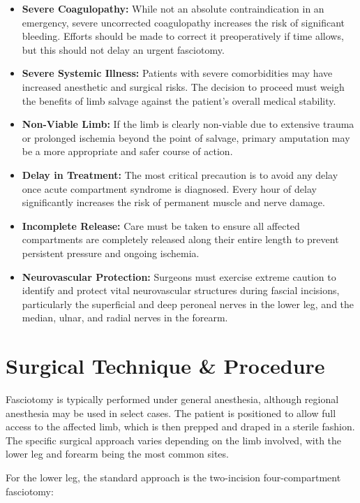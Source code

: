 \begin{itemize}
  \item \textbf{Severe Coagulopathy:} While not an absolute contraindication in an emergency, severe uncorrected coagulopathy increases the risk of significant bleeding. Efforts should be made to correct it preoperatively if time allows, but this should not delay an urgent fasciotomy.
  \item \textbf{Severe Systemic Illness:} Patients with severe comorbidities may have increased anesthetic and surgical risks. The decision to proceed must weigh the benefits of limb salvage against the patient's overall medical stability.
  \item \textbf{Non-Viable Limb:} If the limb is clearly non-viable due to extensive trauma or prolonged ischemia beyond the point of salvage, primary amputation may be a more appropriate and safer course of action.
  \item \textbf{Delay in Treatment:} The most critical precaution is to avoid any delay once acute compartment syndrome is diagnosed. Every hour of delay significantly increases the risk of permanent muscle and nerve damage.
  \item \textbf{Incomplete Release:} Care must be taken to ensure all affected compartments are completely released along their entire length to prevent persistent pressure and ongoing ischemia.
  \item \textbf{Neurovascular Protection:} Surgeons must exercise extreme caution to identify and protect vital neurovascular structures during fascial incisions, particularly the superficial and deep peroneal nerves in the lower leg, and the median, ulnar, and radial nerves in the forearm.
\end{itemize}

\section*{Surgical Technique \& Procedure}
Fasciotomy is typically performed under general anesthesia, although regional anesthesia may be used in select cases. The patient is positioned to allow full access to the affected limb, which is then prepped and draped in a sterile fashion. The specific surgical approach varies depending on the limb involved, with the lower leg and forearm being the most common sites.

For the lower leg, the standard approach is the two-incision four-compartment fasciotomy:

